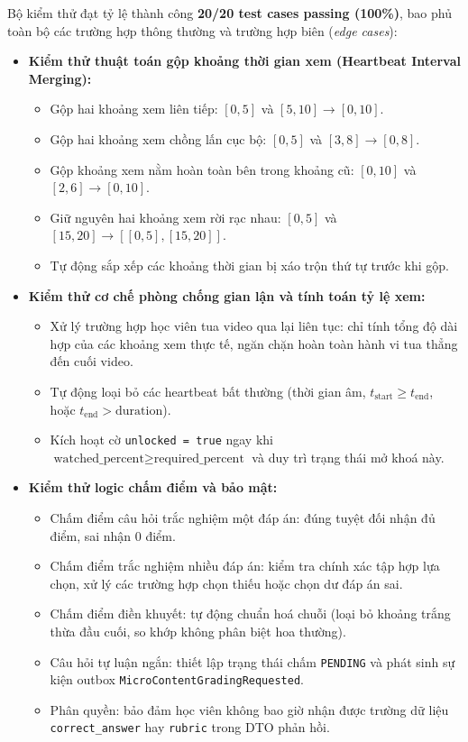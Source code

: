 Bộ kiểm thử đạt tỷ lệ thành công \textbf{20/20 test cases passing (100\%)}, bao phủ toàn bộ các trường hợp thông thường và trường hợp biên (\textit{edge cases}):
\begin{itemize}
    \item \textbf{Kiểm thử thuật toán gộp khoảng thời gian xem (Heartbeat Interval Merging):}
          \begin{itemize}
              \item Gộp hai khoảng xem liên tiếp: $[0, 5]$ và $[5, 10] \to [0, 10]$.
              \item Gộp hai khoảng xem chồng lấn cục bộ: $[0, 5]$ và $[3, 8] \to [0, 8]$.
              \item Gộp khoảng xem nằm hoàn toàn bên trong khoảng cũ: $[0, 10]$ và $[2, 6] \to [0, 10]$.
              \item Giữ nguyên hai khoảng xem rời rạc nhau: $[0, 5]$ và $[15, 20] \to [[0, 5], [15, 20]]$.
              \item Tự động sắp xếp các khoảng thời gian bị xáo trộn thứ tự trước khi gộp.
          \end{itemize}
    \item \textbf{Kiểm thử cơ chế phòng chống gian lận và tính toán tỷ lệ xem:}
          \begin{itemize}
              \item Xử lý trường hợp học viên tua video qua lại liên tục: chỉ tính tổng độ dài hợp của các khoảng xem thực tế, ngăn chặn hoàn toàn hành vi tua thẳng đến cuối video.
              \item Tự động loại bỏ các heartbeat bất thường (thời gian âm, $t_{\text{start}} \ge t_{\text{end}}$, hoặc $t_{\text{end}} > \text{duration}$).
              \item Kích hoạt cờ \texttt{unlocked = true} ngay khi $\text{watched\_percent} \ge \text{required\_percent}$ và duy trì trạng thái mở khoá này.
          \end{itemize}
    \item \textbf{Kiểm thử logic chấm điểm và bảo mật:}
          \begin{itemize}
              \item Chấm điểm câu hỏi trắc nghiệm một đáp án: đúng tuyệt đối nhận đủ điểm, sai nhận 0 điểm.
              \item Chấm điểm trắc nghiệm nhiều đáp án: kiểm tra chính xác tập hợp lựa chọn, xử lý các trường hợp chọn thiếu hoặc chọn dư đáp án sai.
              \item Chấm điểm điền khuyết: tự động chuẩn hoá chuỗi (loại bỏ khoảng trắng thừa đầu cuối, so khớp không phân biệt hoa thường).
              \item Câu hỏi tự luận ngắn: thiết lập trạng thái chấm \texttt{PENDING} và phát sinh sự kiện outbox \texttt{MicroContentGradingRequested}.
              \item Phân quyền: bảo đảm học viên không bao giờ nhận được trường dữ liệu \texttt{correct\_answer} hay \texttt{rubric} trong DTO phản hồi.
          \end{itemize}
\end{itemize}

